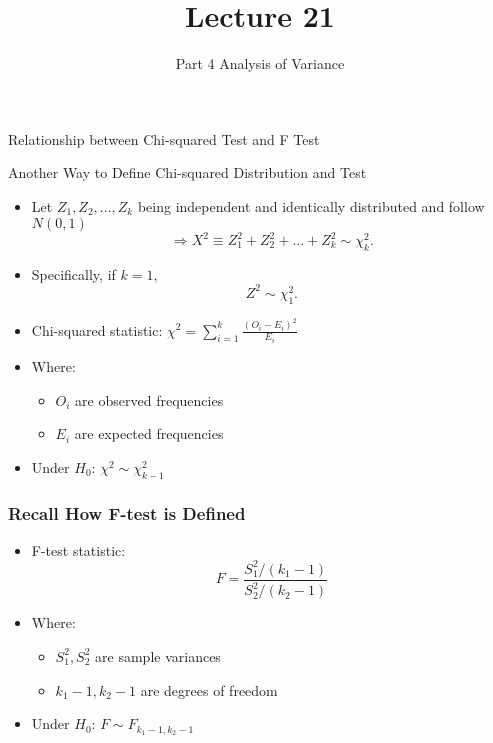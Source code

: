 \documentclass[12pt]{beamer}
\title[ECON2843]{Lecture 21}
\subtitle{Part 4 Analysis of Variance}
\date{}
\begin{document}
	\begin{frame}
		\titlepage
		
	\end{frame}
	\begin{frame}
		\vspace{1cm}
		\centering
		{\color{blue}\large Relationship between Chi-squared Test and F Test}
	\end{frame}

\begin{frame}{Another Way to Define Chi-squared Distribution and Test}
	\begin{itemize}[label={\color{blue}$\blacktriangleright$}]
		\item Let $Z_1, Z_2, \ldots, Z_k$ being independent and identically distributed and follow $N(0,1)$
		$$\Rightarrow X^2 \equiv Z_1^2 + Z_2^2 + \ldots + Z_k^2 \sim \chi_k^2.$$
		\item Specifically, if $k= 1,$
		$$Z^2 \sim \chi_1^2.$$
\end{itemize}
\begin{itemize}[label={\color{blue}$\blacktriangleright$}]
	\item Chi-squared statistic: $\chi^2 = \sum_{i=1}^k \frac{(O_i - E_i)^2}{E_i}$
	\item Where:
	\begin{itemize}[label={\color{blue}$\blacktriangleright$}]
		\item $O_i$ are observed frequencies
		\item $E_i$ are expected frequencies
	\end{itemize}
	\item Under $H_0$: $\chi^2 \sim \chi^2_{k-1}$
\end{itemize}
\end{frame}
	\begin{frame}
		\frametitle{Recall How F-test is Defined}
		\begin{itemize}[label={\color{blue}$\blacktriangleright$}]
			\item F-test statistic:
			$$F = \frac{S_1^2/(k_1-1)}{S_2^2/(k_2-1)}$$
			\item Where:
			\begin{itemize}[label={\color{blue}$\blacktriangleright$}]
				\item $S_1^2, S_2^2$ are sample variances
				\item $k_1-1, k_2-1$ are degrees of freedom
			\end{itemize}
			\item Under $H_0$: $F \sim F_{k_1-1,k_2-1}$
		\end{itemize}
	\end{frame}
	
\end{document}
